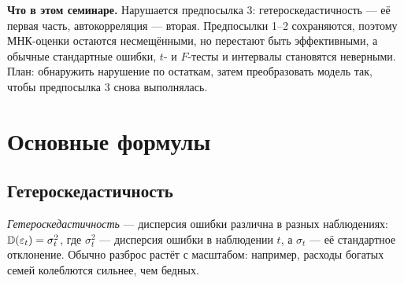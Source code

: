 \textbf{Что в этом семинаре.} Нарушается предпосылка 3: гетероскедастичность
— её первая часть, автокорреляция — вторая. Предпосылки 1--2 сохраняются,
поэтому МНК-оценки остаются несмещёнными, но перестают быть эффективными, а
обычные стандартные ошибки, $t$- и $F$-тесты и интервалы становятся неверными.
План: обнаружить нарушение по остаткам, затем преобразовать модель так, чтобы
предпосылка 3 снова выполнялась.

\clearpage
\section{Основные формулы}

\subsection{Гетероскедастичность}\label{sec:het}

\emph{Гетероскедастичность} — дисперсия ошибки различна в разных
наблюдениях: $\mathbb{D}(\varepsilon_t) = \sigma_t^2$, где $\sigma_t^2$ — дисперсия
ошибки в наблюдении $t$, а $\sigma_t$ — её стандартное отклонение. Обычно
разброс растёт с масштабом: например, расходы богатых семей колеблются
сильнее, чем бедных.

\variancevisual

